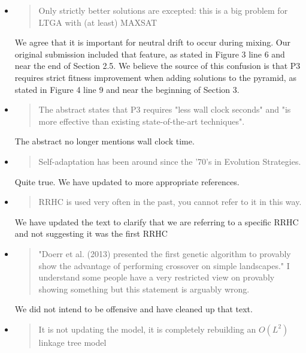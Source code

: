\documentclass[]{article}
\begin{document}
\begin{itemize}
\item
\begin{quote}
Only strictly better solutions are excepted: this is a big problem for LTGA with (at least) MAXSAT
\end{quote}

We agree that it is important for neutral drift to occur during mixing. Our original submission included that feature,
as stated in Figure 3 line 6 and near the end of Section 2.5. We believe the source of this confusion is that P3
requires strict fitness improvement when adding solutions to the pyramid, as stated in Figure 4 line 9 and near the beginning
of Section 3.

\item
\begin{quote}
The abstract states that P3 requires "less wall clock seconds" and "is more effective than existing state-of-the-art techniques".
\end{quote}

The abstract no longer mentions wall clock time.

\item
\begin{quote}
 Self-adaptation has been around since the '70's in Evolution Strategies.
\end{quote}

Quite true. We have updated to more appropriate references.

\item
\begin{quote}
RRHC is used very often in the past, you cannot refer to it in this way.
\end{quote}

We have updated the text to clarify that we are referring to a specific RRHC and not suggesting it was the first RRHC

\item
\begin{quote}
"Doerr et al. (2013) presented the first genetic algorithm to provably show the advantage of performing crossover on simple landscapes."
I understand some people have a very restricted view on provably showing something but this statement is arguably wrong.
\end{quote}

We did not intend to be offensive and have cleaned up that text.

\item
\begin{quote}
It is not updating the model, it is completely rebuilding an $O(L^2)$ linkage tree model 
\end{quote}


\end{itemize}
\end{document}

